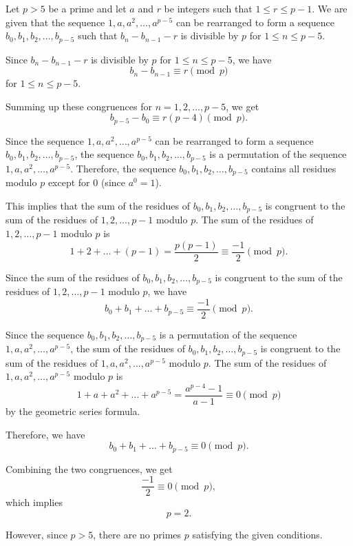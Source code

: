Let \( p > 5 \) be a prime and let \( a \) and \( r \) be integers such that \( 1 \leq r \leq p-1 \). We are given that the sequence \( 1,a,a^2,\dots,a^{p-5} \) can be rearranged to form a sequence \( b_0,b_1,b_2,\dots,b_{p-5} \) such that \( b_n-b_{n-1}-r \) is divisible by \( p \) for \( 1 \leq n \leq p-5 \).

Since \( b_n-b_{n-1}-r \) is divisible by \( p \) for \( 1 \leq n \leq p-5 \), we have
\[ b_n - b_{n-1} \equiv r \pmod{p} \]
for \( 1 \leq n \leq p-5 \).

Summing up these congruences for \( n = 1, 2, \ldots, p-5 \), we get
\[ b_{p-5} - b_0 \equiv r(p-4) \pmod{p}. \]

Since the sequence \( 1,a,a^2,\dots,a^{p-5} \) can be rearranged to form a sequence \( b_0,b_1,b_2,\dots,b_{p-5} \), the sequence \( b_0,b_1,b_2,\dots,b_{p-5} \) is a permutation of the sequence \( 1,a,a^2,\dots,a^{p-5} \). Therefore, the sequence \( b_0,b_1,b_2,\dots,b_{p-5} \) contains all residues modulo \( p \) except for \( 0 \) (since \( a^0 = 1 \)).

This implies that the sum of the residues of \( b_0,b_1,b_2,\dots,b_{p-5} \) is congruent to the sum of the residues of \( 1,2,\dots,p-1 \) modulo \( p \). The sum of the residues of \( 1,2,\dots,p-1 \) modulo \( p \) is
\[ 1 + 2 + \ldots + (p-1) = \frac{p(p-1)}{2} \equiv \frac{-1}{2} \pmod{p}. \]

Since the sum of the residues of \( b_0,b_1,b_2,\dots,b_{p-5} \) is congruent to the sum of the residues of \( 1,2,\dots,p-1 \) modulo \( p \), we have
\[ b_0 + b_1 + \ldots + b_{p-5} \equiv \frac{-1}{2} \pmod{p}. \]

Since the sequence \( b_0,b_1,b_2,\dots,b_{p-5} \) is a permutation of the sequence \( 1,a,a^2,\dots,a^{p-5} \), the sum of the residues of \( b_0,b_1,b_2,\dots,b_{p-5} \) is congruent to the sum of the residues of \( 1,a,a^2,\dots,a^{p-5} \) modulo \( p \). The sum of the residues of \( 1,a,a^2,\dots,a^{p-5} \) modulo \( p \) is
\[ 1 + a + a^2 + \ldots + a^{p-5} = \frac{a^{p-4}-1}{a-1} \equiv 0 \pmod{p} \]
by the geometric series formula.

Therefore, we have
\[ b_0 + b_1 + \ldots + b_{p-5} \equiv 0 \pmod{p}. \]

Combining the two congruences, we get
\[ \frac{-1}{2} \equiv 0 \pmod{p}, \]
which implies
\[ p = 2. \]

However, since \( p > 5 \), there are no primes \( p \) satisfying the given conditions.
